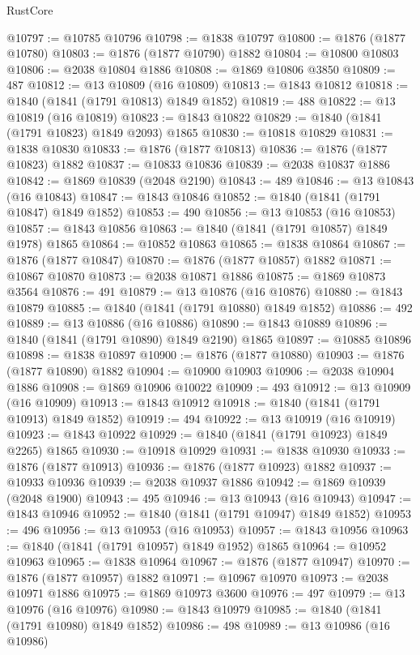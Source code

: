 \begin{lexlean}{RustCore}
\begin{coremodule}
@10797 := @10785 @10796
@10798 := @1838 @10797
@10800 := @1876 (@1877 @10780)
@10803 := @1876 (@1877 @10790) @1882
@10804 := @10800 @10803
@10806 := @2038 @10804 @1886
@10808 := @1869 @10806 @3850
@10809 := 487
@10812 := @13 @10809 (@16 @10809)
@10813 := @1843 @10812
@10818 := @1840 (@1841 (@1791 @10813) @1849 @1852)
@10819 := 488
@10822 := @13 @10819 (@16 @10819)
@10823 := @1843 @10822
@10829 := @1840 (@1841 (@1791 @10823) @1849 @2093) @1865
@10830 := @10818 @10829
@10831 := @1838 @10830
@10833 := @1876 (@1877 @10813)
@10836 := @1876 (@1877 @10823) @1882
@10837 := @10833 @10836
@10839 := @2038 @10837 @1886
@10842 := @1869 @10839 (@2048 @2190)
@10843 := 489
@10846 := @13 @10843 (@16 @10843)
@10847 := @1843 @10846
@10852 := @1840 (@1841 (@1791 @10847) @1849 @1852)
@10853 := 490
@10856 := @13 @10853 (@16 @10853)
@10857 := @1843 @10856
@10863 := @1840 (@1841 (@1791 @10857) @1849 @1978) @1865
@10864 := @10852 @10863
@10865 := @1838 @10864
@10867 := @1876 (@1877 @10847)
@10870 := @1876 (@1877 @10857) @1882
@10871 := @10867 @10870
@10873 := @2038 @10871 @1886
@10875 := @1869 @10873 @3564
@10876 := 491
@10879 := @13 @10876 (@16 @10876)
@10880 := @1843 @10879
@10885 := @1840 (@1841 (@1791 @10880) @1849 @1852)
@10886 := 492
@10889 := @13 @10886 (@16 @10886)
@10890 := @1843 @10889
@10896 := @1840 (@1841 (@1791 @10890) @1849 @2190) @1865
@10897 := @10885 @10896
@10898 := @1838 @10897
@10900 := @1876 (@1877 @10880)
@10903 := @1876 (@1877 @10890) @1882
@10904 := @10900 @10903
@10906 := @2038 @10904 @1886
@10908 := @1869 @10906 @10022
@10909 := 493
@10912 := @13 @10909 (@16 @10909)
@10913 := @1843 @10912
@10918 := @1840 (@1841 (@1791 @10913) @1849 @1852)
@10919 := 494
@10922 := @13 @10919 (@16 @10919)
@10923 := @1843 @10922
@10929 := @1840 (@1841 (@1791 @10923) @1849 @2265) @1865
@10930 := @10918 @10929
@10931 := @1838 @10930
@10933 := @1876 (@1877 @10913)
@10936 := @1876 (@1877 @10923) @1882
@10937 := @10933 @10936
@10939 := @2038 @10937 @1886
@10942 := @1869 @10939 (@2048 @1900)
@10943 := 495
@10946 := @13 @10943 (@16 @10943)
@10947 := @1843 @10946
@10952 := @1840 (@1841 (@1791 @10947) @1849 @1852)
@10953 := 496
@10956 := @13 @10953 (@16 @10953)
@10957 := @1843 @10956
@10963 := @1840 (@1841 (@1791 @10957) @1849 @1952) @1865
@10964 := @10952 @10963
@10965 := @1838 @10964
@10967 := @1876 (@1877 @10947)
@10970 := @1876 (@1877 @10957) @1882
@10971 := @10967 @10970
@10973 := @2038 @10971 @1886
@10975 := @1869 @10973 @3600
@10976 := 497
@10979 := @13 @10976 (@16 @10976)
@10980 := @1843 @10979
@10985 := @1840 (@1841 (@1791 @10980) @1849 @1852)
@10986 := 498
@10989 := @13 @10986 (@16 @10986)

\end{coremodule}
\end{lexlean}
